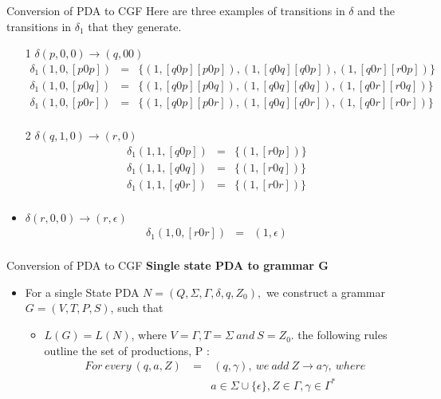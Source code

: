 \documentclass{beamer}
\begin{document}
\begin{frame}{Conversion of PDA to CGF}
	\small
Here are three examples of transitions in $\delta$ and the transitions in $\delta_1$ that they generate.
\begin{itemize}
	\item[1]  $\delta(p, 0, 0) \rightarrow (q, 00)$
\begin{eqnarray*}
\delta_1(1, 0, [p0p]) &=& \{(1, [q0p][p0p]),(1, [q0q][q0p]),(1, [q0r][r0p])\} \\
\delta_1(1, 0, [p0q]) &=& \{(1, [q0p][p0q]),(1, [q0q][q0q]),(1, [q0r][r0q])\} \\
\delta_1(1, 0, [p0r]) &=& \{(1, [q0p][p0r]),(1, [q0q][q0r]),(1, [q0r][r0r])\} \\
\end{eqnarray*}
\item[2] $\delta(q, 1, 0) \rightarrow (r, 0)$
\begin{eqnarray*}
	\delta_1(1, 1, [q0p]) &=& \{(1, [r0p])\} \\
	\delta_1(1, 1, [q0q]) &=& \{(1, [r0q])\} \\
	\delta_1(1, 1, [q0r]) &=& \{(1, [r0r])\} \\
\end{eqnarray*}
\item $\delta(r, 0, 0) \rightarrow (r, \epsilon)$
\begin{eqnarray*}
\delta_1(1, 0, [r0r]) &=& {(1, \epsilon)} \\
\end{eqnarray*}
\end{itemize}
\end{frame}
\begin{frame}{Conversion of PDA to CGF}
	\textbf{Single state PDA to grammar G}
	\begin{itemize}
		\item For a single State PDA $N = (Q, \Sigma, \Gamma, \delta, q, Z_0),$ we construct a grammar	$G = (V,T,P,S)$, such that
		\begin{itemize}
			\item $L(G) = L(N)$, where $V = \Gamma, T = \Sigma \ and\  S = Z_0$. the following rules outline the set of productions, P :
			\begin{eqnarray*}
				For\  every\  (q, a, Z)\  &=&\  (q, \gamma),\  we\  add\  Z \rightarrow a\gamma, \ where\ \\
				&\  & a \in \Sigma \cup \{\epsilon\},	Z \in \Gamma, \gamma \in \Gamma^* \\
			\end{eqnarray*}
		\end{itemize} 
	\end{itemize}
\end{frame}
\end{document}
